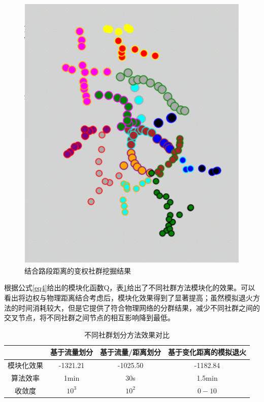 				\begin{figure}
				\centering
				\includegraphics[width=4.4in]{picture/fenqunjieguo}
				\caption{结合路段距离的变权社群挖掘结果}
				\label{fenqun3}
				\end{figure}

		根据公式\ref{eq4}给出的模块化函数Q，表\ref{table10}给出了不同社群方法模块化的效果。可以看出将边权与物理距离结合考虑后，模块化效果得到了显著提高；虽然模拟退火方法的时间消耗较大，但是它提供了符合物理网络的分群结果，减少不同社群之间的交叉节点，将不同社群之间节点的相互影响降到最低。

				\begin{table}[h]
				\centering
				\begin{tabular}{|c|c|c|c|}
				\hline
				\hline
				   &   基于流量划分 &   基于流量/距离划分 &   基于变化距离的模拟退火  \\
				\hline
				  模块化效果 &   -1321.21 &   -1025.50 &   -1182.84  \\
				\hline
				  算法效率 &   1min &  30s   &   1.5min  \\
				\hline
				  收敛度 &   $10^3$ &   $10^2$ &   $0-10$  \\
				\hline
				\end{tabular}
				\caption{不同社群划分方法效果对比}
				\label{table10}
				\end{table} 



